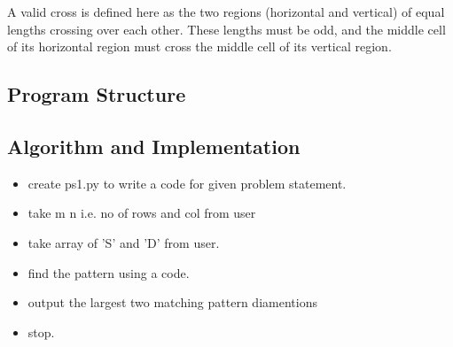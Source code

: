 \documentclass[a4paper,12pt]{article}
\begin{document}
	A valid cross is defined here as the two regions (horizontal and vertical) of equal lengths crossing over each other. These lengths must be odd, and the middle cell of its horizontal region must cross the middle cell of its vertical region.\\
	
	

	\subsection{Program Structure}
	

	
	\subsection{Algorithm and Implementation}
	\begin{itemize}
		\item create ps1.py to write a code for given problem statement.
		\item take m n i.e. no of rows and col from user
		\item take array of 'S' and 'D' from user.
		\item find the pattern using a code.
		\item output the largest two matching pattern diamentions
		\item stop.
   \end{itemize}
\end{document}
